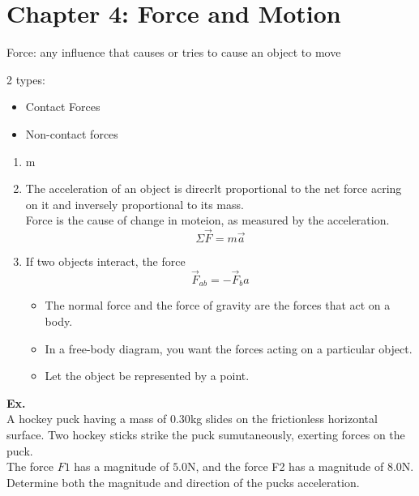 \documentclass[]{article}
\date{}
\title{\docTitle}
\author{\docAuthor}
\date{\today}
\begin{document}
\maketitle
\section*{Chapter 4: Force and Motion}
Force: any influence that causes or tries to cause an object to move

2 types:\
\begin{itemize}
\item Contact Forces
\item Non-contact forces
\end{itemize}

\begin{enumerate}
    \item m
    \item The acceleration of an object is direcrlt proportional to the net force acring on it and inversely proportional to its mass.\\
    Force is the cause of change in moteion, as measured by the acceleration.
    \begin{equation}
        \Sigma \vec{F} = m\vec{a}
    \end{equation}
    \item If two objects interact, the force 
    \begin{equation}
        \vec{F}_{ab} = -\vec{F}_ba
    \end{equation}
    \begin{itemize}
        \item The normal force and the force of gravity are the forces that act on a body.
        \item In a free-body diagram, you want the forces acting on a particular object.
        \item Let the object be represented by a point.
    \end{itemize}
\end{enumerate}

\textbf{Ex.}\\
A hockey puck having a mass of $0.30$kg slides on the frictionless horizontal surface. Two hockey sticks strike the puck sumutaneously, exerting forces on the puck.\\
The force $F1$ has a magnitude of $5.0$N, and the force F2 has a magnitude of $8.0$N.\\
Determine both the magnitude and direction of the pucks acceleration.
\end{document}
